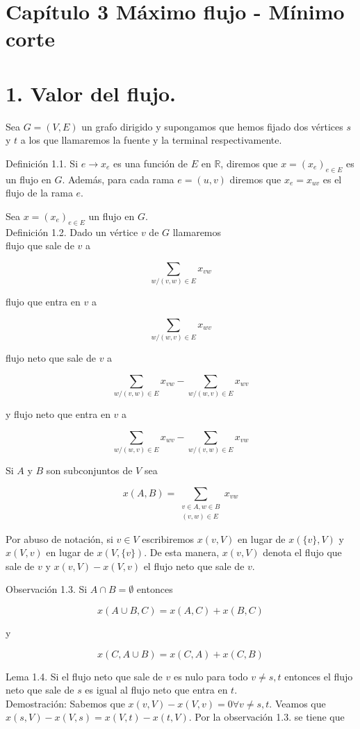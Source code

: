 \documentclass[10pt]{article}
\begin{document}
\section*{Capítulo 3 Máximo flujo - Mínimo corte}
\section*{1. Valor del flujo.}
Sea $G=(V, E)$ un grafo dirigido y supongamos que hemos fijado dos vértices $s$ y $t$ a los que llamaremos la fuente y la terminal respectivamente.

Definición 1.1. Si $e \longrightarrow x_{e}$ es una función de $E$ en $\mathbb{R}$, diremos que $x=\left(x_{e}\right)_{e \in E}$ es un flujo en $G$. Además, para cada rama $e=(u, v)$ diremos que $x_{e}=x_{u v}$ es el flujo de la rama $e$.

Sea $x=\left(x_{e}\right)_{e \in E}$ un flujo en $G$.\\
Definición 1.2. Dado un vértice $v$ de $G$ llamaremos\\
flujo que sale de $v$ a

$$
\sum_{w /(v, w) \in E} x_{v w}
$$

flujo que entra en $v$ a

$$
\sum_{w /(w, v) \in E} x_{w v}
$$

flujo neto que sale de $v$ a

$$
\sum_{w /(v, w) \in E} x_{v w}-\sum_{w /(w, v) \in E} x_{w v}
$$

y flujo neto que entra en $v$ a

$$
\sum_{w /(w, v) \in E} x_{w v}-\sum_{w /(v, w) \in E} x_{v w}
$$

Si $A$ y $B$ son subconjuntos de $V$ sea

$$
x(A, B)=\sum_{\substack{v \in A, w \in B \\(v, w) \in E}} x_{v w}
$$

Por abuso de notación, si $v \in V$ escribiremos $x(v, V)$ en lugar de $x(\{v\}, V)$ y $x(V, v)$ en lugar de $x(V,\{v\})$. De esta manera, $x(v, V)$ denota el flujo que sale de $v$ y $x(v, V)-x(V, v)$ el flujo neto que sale de $v$.

Observación 1.3. Si $A \cap B=\emptyset$ entonces

$$
x(A \cup B, C)=x(A, C)+x(B, C)
$$

y

$$
x(C, A \cup B)=x(C, A)+x(C, B)
$$

Lema 1.4. Si el flujo neto que sale de $v$ es nulo para todo $v \neq s, t$ entonces el flujo neto que sale de $s$ es igual al flujo neto que entra en $t$.\\
Demostración: Sabemos que $x(v, V)-x(V, v)=0 \forall v \neq s, t$. Veamos que $x(s, V)-x(V, s)=x(V, t)-x(t, V)$. Por la observación 1.3. se tiene que
\end{document}
